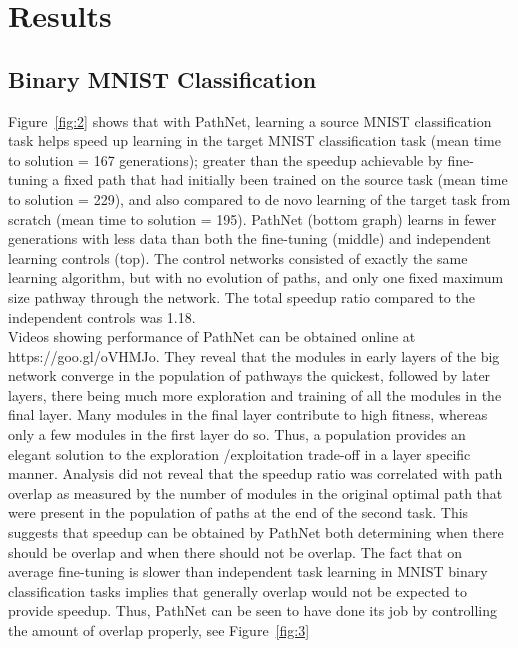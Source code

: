 \documentclass{sig-alternate-05-2015}
\begin{document}
\section{Results} 

\subsection{Binary MNIST Classification} 

Figure~\ref{fig:2} shows that with PathNet, learning a source MNIST classification task helps speed up learning in the target MNIST classification task (mean time to solution = 167 generations); greater than the speedup achievable by fine-tuning a fixed path that had initially been trained on the source task (mean time to solution = 229), and also compared to de novo learning of the target task from scratch (mean time to solution = 195). PathNet (bottom graph) learns in fewer generations with less data than both the fine-tuning (middle) and independent learning controls (top). The control networks consisted of exactly the same learning algorithm, but with no evolution of paths, and only one fixed maximum size pathway through the network. The total speedup ratio compared to the independent controls was 1.18. \\

Videos showing performance of PathNet can be obtained online at https://goo.gl/oVHMJo. They reveal that the modules in early layers of the big network converge in the population of pathways the quickest, followed by later layers, there being much more exploration and training of all the modules in the final layer. Many modules in the final layer contribute to high fitness, whereas only a few modules in the first layer do so. Thus, a population provides an elegant solution to the exploration /exploitation trade-off in a layer specific manner. Analysis did not reveal that the speedup ratio was correlated with path overlap as measured by the number of modules in the original optimal path that were present in the population of paths at the end of the second task. This suggests that speedup can be obtained by PathNet both determining when there should be overlap and when there should not be overlap. The fact that on average fine-tuning is slower than independent task learning in MNIST binary classification tasks implies that generally overlap would not be expected to provide speedup. Thus, PathNet can be seen to have done its job by controlling the amount of overlap properly, see Figure~\ref{fig:3} \\
\end{document}

